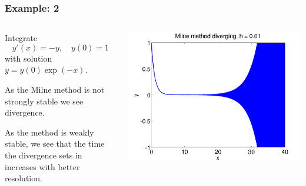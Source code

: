 \documentclass{beamer}
\begin{document}
\begin{frame}
  \frametitle{Example: 2}

  \begin{columns}
    \begin{column}{0.5\textwidth}
      Integrate
      \begin{equation*}
        y'(x) = -y, \quad y(0) = 1
      \end{equation*}
      with solution $y = y(0)\exp(-x)$. \pause

      \vspace{1ex}

      As the Milne method is not strongly stable we see
      divergence. \pause

      \vspace{1ex}

      As the method is weakly stable, we see that the time the
      divergence sets in increases with better resolution.
    \end{column}
    \begin{column}{0.5\textwidth}
      \begin{overlayarea}{\textwidth}{0.6\textheight}
        {
          \begin{center}
            \includegraphics[height=0.5\textheight]{figures/MilneStability1}
          \end{center}
        }
        {
          \begin{center}

\end{center}}
\end{overlayarea}
\end{column}
\end{columns}
\end{frame}
\end{document}
